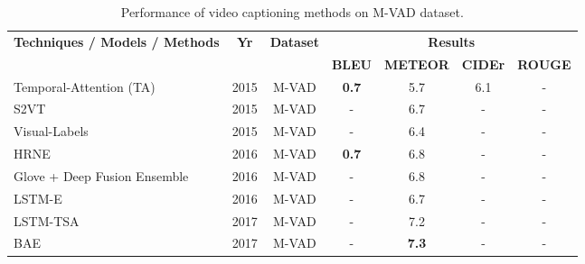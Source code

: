 \documentclass[10pt,journal,compsoc]{IEEEtran}
\begin{document}
\begin{table*}[htbp]
  \centering
  \small
  \setlength{\tabcolsep}{10.0pt}       %
\caption{Performance of video captioning methods on M-VAD dataset.}
\vspace{-2mm}
     \begin{tabular}{|p{15.43em}|c|c|c|c|c|c|}
    \hline
    \multirow{2}[1]{*}{\textbf{Techniques / Models / Methods}} & \multirow{2}[1]{*}{\textbf{Yr}} & \multirow{2}[1]{*}{\textbf{Dataset}} & \multicolumn{4}{c|}{\textbf{Results}} \\
\cline{4-7}    \multicolumn{1}{|l|}{} & & & \textbf{BLEU} & \textbf{METEOR} & \textbf{CIDEr} & \textbf{ROUGE} \\
    \hline
    Temporal-Attention (TA) \cite{yao2015describing} & 2015  & {M-VAD} & \textbf{0.7}   & 5.7   & 6.1   & - \\
    \hline
    S2VT \cite{venugopalan2015sequence} & 2015  & {M-VAD} & -     & 6.7   & -     & - \\
    \hline
    Visual-Labels \cite{rohrbach2015long} & 2015  & {M-VAD} & - & 6.4 & - & - \\
    \hline
    \multicolumn{1}{|l|}{HRNE \cite{pan2016hierarchical}}  & 2016  & {M-VAD} & \textbf{0.7}   & 6.8   & -     & - \\
    \hline
    \multicolumn{1}{|l|}{Glove + Deep Fusion Ensemble \cite{venugopalan2016improving}}  & 2016  & M-VAD  & - & 6.8  & - & - \\
    \hline
    LSTM-E \cite{pan2016jointly} & 2016  & {M-VAD} & -     & 6.7   & -     & - \\
    \hline
    \multicolumn{1}{|l|}{LSTM-TSA \cite{Pan_2017_CVPR}} & 2017  & M-VAD  & -  & 7.2 & - & - \\
    \hline
    \multicolumn{1}{|l|}{BAE \cite{Baraldi_2017_CVPR}} & 2017  & M-VAD & -  & \textbf{7.3} & -  & - \\
    \hline
    \end{tabular}%
  \label{tab:mvadresults}%
 \end{table*}%
\end{document}
